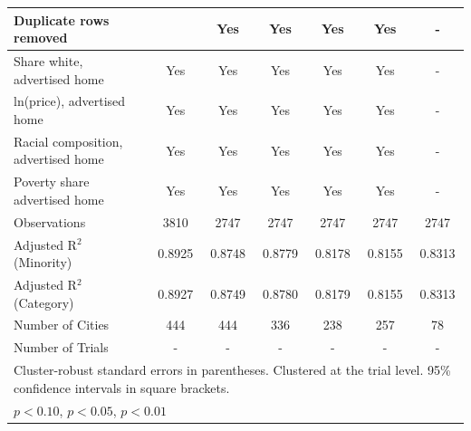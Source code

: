 \begin{table}[htbp]
{\begin{tabular}{l*{6}{c}}
Duplicate rows removed &  & Yes & Yes & Yes & Yes & - \\
\midrule
Share white, advertised home  & Yes & Yes & Yes & Yes & Yes & - \\
ln(price), advertised home  & Yes & Yes & Yes & Yes & Yes & - \\
Racial composition, advertised home & Yes & Yes & Yes & Yes & Yes & - \\
Poverty share advertised home & Yes & Yes & Yes & Yes & Yes & - \\
Observations & 3810 & 2747 & 2747 & 2747 & 2747 & 2747 \\
Adjusted R$^2$ (Minority) & 0.8925 & 0.8748 & 0.8779 & 0.8178 & 0.8155 & 0.8313 \\
Adjusted R$^2$ (Category) & 0.8927 & 0.8749 & 0.8780 & 0.8179 & 0.8155 & 0.8313 \\
Number of Cities & 444 & 444 & 336 & 238 & 257 & 78 \\
Number of Trials & - & - & - & - & - & - \\
\bottomrule
\multicolumn{7}{l}{\footnotesize Cluster-robust standard errors in parentheses. Clustered at the trial level. 95\% confidence intervals in square brackets.}\\
\multicolumn{7}{l}{\footnotesize \sym{*} \(p<0.10\), \sym{**} \(p<0.05\), \sym{***} \(p<0.01\)}\\
\end{tabular}
}
\end{table}
